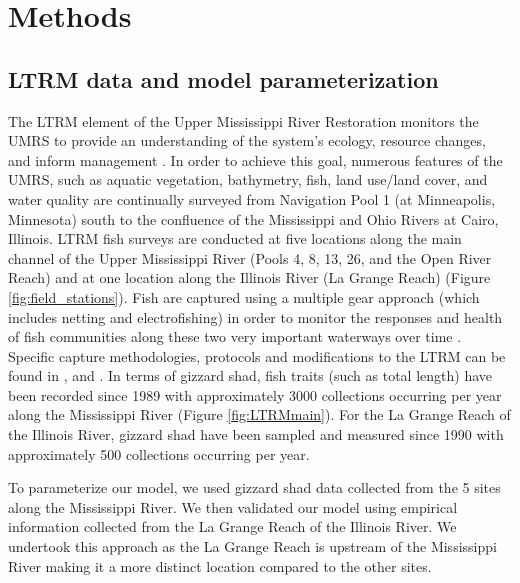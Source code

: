\documentclass[preprint,review,12pt,authoryear]{elsarticle}
\begin{document}
\section{Methods}
\subsection{LTRM data and model parameterization} \label{LTRM}
The LTRM element of the Upper Mississippi River Restoration monitors the UMRS to provide an understanding of the system's ecology, resource changes, and inform management \citep{bouska2018developing, UMRR2015}.
In order to achieve this goal, numerous features of the UMRS, such as aquatic vegetation, bathymetry, fish, land use/land cover, and water quality are continually surveyed from Navigation Pool 1 (at Minneapolis, Minnesota) south to the confluence of the Mississippi and Ohio Rivers at Cairo, Illinois. 
LTRM fish surveys are conducted at five locations along the main channel of the Upper Mississippi River (Pools 4, 8, 13, 26, and the Open River Reach) and at one location along the Illinois River (La Grange Reach) (Figure \ref{fig:field_stations}). 
Fish are captured using a multiple gear approach (which includes netting and electrofishing) in order to monitor the responses and health of fish communities along these two very important waterways over time \citep{gutreuter1995long}. 
Specific capture methodologies, protocols and modifications to the LTRM can be found in \cite{gutreuter1995long}, and \cite{ickes2002evaluation}. 
In terms of gizzard shad, fish traits (such as total length) have been recorded since 1989 with approximately 3000 collections occurring per year along the Mississippi River (Figure \ref{fig:LTRMmain}). 
For the La Grange Reach of the Illinois River, gizzard shad have been sampled and measured since 1990 with approximately 500 collections occurring per year.

To parameterize our model, we used gizzard shad data collected from the 5 sites along the Mississippi River.  
We then validated our model using empirical information collected from the La Grange Reach of the Illinois River. 
We undertook this approach as the La Grange Reach is upstream of the Mississippi River making it a more distinct location compared to the other sites. 
\end{document}
